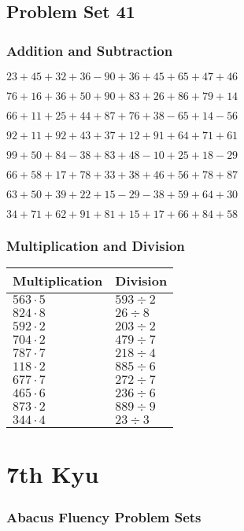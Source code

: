 \hypertarget{problem-set-41}{%
\subsection{Problem Set 41}\label{problem-set-41}}

\hypertarget{addition-and-subtraction}{%
\subsubsection{Addition and
Subtraction}\label{addition-and-subtraction}}

\(23+45+32+36-90+36+45+65+47+46\)

\(76+16+36+50+90+83+26+86+79+14\)

\(66+11+25+44+87+76+38-65+14-56\)

\(92+11+92+43+37+12+91+64+71+61\)

\(99+50+84-38+83+48-10+25+18-29\)

\(66+58+17+78+33+38+46+56+78+87\)

\(63+50+39+22+15-29-38+59+64+30\)

\(34+71+62+91+81+15+17+66+84+58\)

\hypertarget{multiplication-and-division}{%
\subsubsection{Multiplication and
Division}\label{multiplication-and-division}}

\begin{longtable}[]{@{}ll@{}}
\toprule
Multiplication & Division\tabularnewline
\midrule
\endhead
\(563\cdot5\) & \(593÷2\)\tabularnewline
\(824\cdot8\) & \(26÷8\)\tabularnewline
\(592\cdot2\) & \(203÷2\)\tabularnewline
\(704\cdot2\) & \(479÷7\)\tabularnewline
\(787\cdot7\) & \(218÷4\)\tabularnewline
\(118\cdot2\) & \(885÷6\)\tabularnewline
\(677\cdot7\) & \(272÷7\)\tabularnewline
\(465\cdot6\) & \(236÷6\)\tabularnewline
\(873\cdot2\) & \(889÷9\)\tabularnewline
\(344\cdot4\) & \(23÷3\)\tabularnewline
\bottomrule
\end{longtable}

\hypertarget{th-kyu}{%
\section{7th Kyu}\label{th-kyu}}

\hypertarget{abacus-fluency-problem-sets}{%
\subsubsection{Abacus Fluency Problem
Sets}\label{abacus-fluency-problem-sets}}

